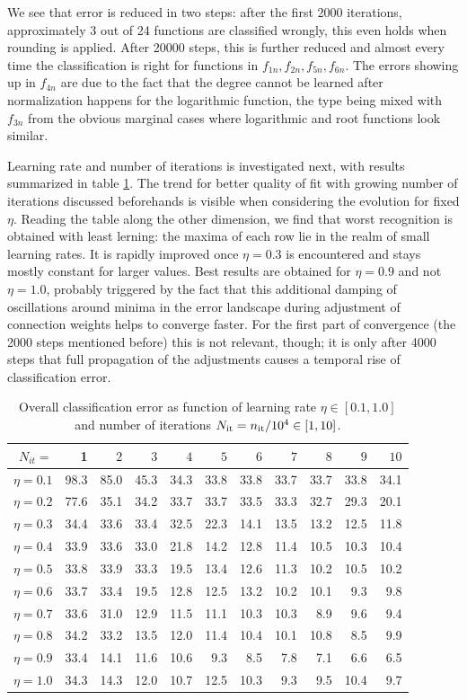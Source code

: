 \documentclass[useAMS,usenatbib]{templates/mn2e}
\begin{document}
%
We see that error is reduced in two steps: after the first 2000
iterations, approximately 3 out of 24 functions are classified
wrongly, this even holds when rounding is applied. After 20000 steps,
this is further reduced and almost every time the classification is
right for functions in $f_{1n},f_{2n},f_{5n},f_{6n}$. The errors
showing up in $f_{4n}$ are due to the fact that the degree cannot be
learned after normalization happens for the logarithmic function, the
type being mixed with $f_{3n}$ from the obvious marginal cases where
logarithmic and root functions look similar.

Learning rate and number of iterations is investigated next, with
results summarized in table \ref{tab:qof}. The trend for better
quality of fit with growing number of iterations discussed beforehands
is visible when considering the evolution for fixed $\eta$. Reading
the table along the other dimension, we find that worst recognition is
obtained with least lerning: the maxima of each row lie in the realm
of small learning rates. It is rapidly improved once $\eta=0.3$ is
encountered and stays mostly constant for larger values. Best results
are obtained for $\eta=0.9$ and not $\eta=1.0$, probably triggered by
the fact that this additional damping of oscillations around minima in
the error landscape during adjustment of connection weights helps to
converge faster. For the first part of convergence (the 2000 steps
mentioned before) this is not relevant, though; it is only after 4000
steps that full propagation of the adjustments causes a temporal rise
of classification error.
\begin{table}
\begin{center}
\begin{tabular}{r|rrrrrrrrrr}\hline\hline
$N_{it}=$&1&$2$&$3$&$4$&$5$&$6$&$7$&$8$&$9$&$10$\\
\hline
$\eta=0.1$&98.3&85.0&45.3&34.3&33.8&33.8&33.7&33.7&33.8&34.1\\
$\eta=0.2$&77.6&35.1&34.2&33.7&33.7&33.5&33.3&32.7&29.3&20.1\\
$\eta=0.3$&34.4&33.6&33.4&32.5&22.3&14.1&13.5&13.2&12.5&11.8\\
$\eta=0.4$&33.9&33.6&33.0&21.8&14.2&12.8&11.4&10.5&10.3&10.4\\
$\eta=0.5$&33.8&33.9&33.3&19.5&13.4&12.6&11.3&10.2&10.5&10.2\\
$\eta=0.6$&33.7&33.4&19.5&12.8&12.5&13.2&10.2&10.1& 9.3& 9.8\\
$\eta=0.7$&33.6&31.0&12.9&11.5&11.1&10.3&10.3& 8.9& 9.6& 9.4\\
$\eta=0.8$&34.2&33.2&13.5&12.0&11.4&10.4&10.1&10.8& 8.5& 9.9\\
$\eta=0.9$&33.4&14.1&11.6&10.6& 9.3& 8.5& 7.8& 7.1& 6.6& 6.5\\
$\eta=1.0$&34.3&14.3&12.0&10.7&12.5&10.3& 9.3& 9.5&10.4& 9.7\\
\hline
\end{tabular}
\end{center}
\caption{\label{tab:qof}Overall classification error as function of learning rate $\eta\in[0.1,1.0]$ and number of iterations $N_{{\rm it}}=n_{{\rm it}}/10^4\in[1,10]$.}
\end{table}
%
\end{document}
